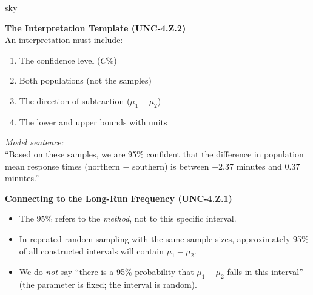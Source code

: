 \documentclass[10pt]{article}
\begin{document}
\begin{skillbox}{sky}
\begin{minipage}[t]{0.48\linewidth}
    \textbf{The Interpretation Template (UNC-4.Z.2)}\\
    An interpretation must include:
    \begin{enumerate}
        \item The confidence level ($C\%$)
        \item Both populations (not the samples)
        \item The direction of subtraction ($\mu_1 - \mu_2$)
        \item The lower and upper bounds with units
    \end{enumerate}
    \textit{Model sentence:}\\
    ``Based on these samples, we are 95\% confident that the difference in population mean
    response times (northern $-$ southern) is between $-2.37$ minutes and $0.37$ minutes.''
\end{minipage}
\hfill
\begin{minipage}[t]{0.48\linewidth}
    \textbf{Connecting to the Long-Run Frequency (UNC-4.Z.1)}\\
    \begin{itemize}
        \item The 95\% refers to the \emph{method}, not to this specific interval.
        \item In repeated random sampling with the same sample sizes, approximately 95\% of
              all constructed intervals will contain $\mu_1 - \mu_2$.
        \item We do \emph{not} say ``there is a 95\% probability that $\mu_1 - \mu_2$
              falls in this interval'' (the parameter is fixed; the interval is random).
    \end{itemize}
\end{minipage}
\end{skillbox}
\end{document}
